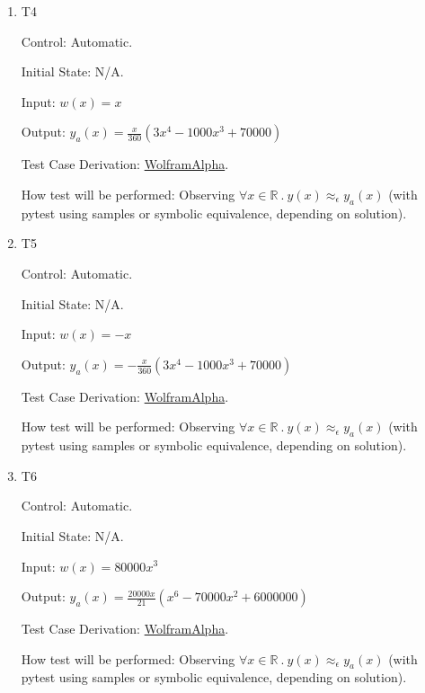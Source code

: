 \documentclass[12pt, titlepage]{article}
\begin{document}
\begin{enumerate}
    \item{T4\\}

    Control: Automatic.

    Initial State: N/A.

    Input: \(w(x) = x\)

    Output: \(y_a(x) = \frac{x}{360} (3x^4 - 1000x^3 + 70000)\)

    Test Case Derivation: \href{https://www.wolframalpha.com/input?i=%5B%2F%2Fmath%3Asolve+y%27%27%27%27%3Dx%2Cy%280%29%3D0%2Cy%2810%29%3D0%2Cy%27%27%280%29%3D0%2Cy%27%27%2810%29%3D0%2F%2F%5D}{WolframAlpha}.

    How test will be performed: Observing \(\forall x \in \mathbb{R}~.~y(x)
    \approx_{\epsilon} y_a(x)\) (with pytest using samples or symbolic
    equivalence, depending on solution).

    \item{T5\\}

    Control: Automatic.

    Initial State: N/A.

    Input: \(w(x) = - x\)

    Output: \(y_a(x) = - \frac{x}{360} (3x^4 - 1000x^3 + 70000)\)

    Test Case Derivation: \href{https://www.wolframalpha.com/input?i=%5B%2F%2Fmath%3Asolve+y%27%27%27%27%3D-x%2Cy%280%29%3D0%2Cy%2810%29%3D0%2Cy%27%27%280%29%3D0%2Cy%27%27%2810%29%3D0%2F%2F%5D}{WolframAlpha}.

    How test will be performed: Observing \(\forall x \in \mathbb{R}~.~y(x)
    \approx_{\epsilon} y_a(x)\) (with pytest using samples or symbolic
    equivalence, depending on solution).

    \item{T6\\}

    Control: Automatic.

    Initial State: N/A.

    Input: \(w(x) = 80000x^3\)

    Output: \(y_a(x) = \frac{20000x}{21} (x^6 - 70000x^2 + 6000000)\)

    Test Case Derivation: \href{https://www.wolframalpha.com/input?i=%5B%2F%2Fmath%3Asolve+y%27%27%27%27%3D80000x%5E3%2Cy%280%29%3D0%2Cy%2810%29%3D0%2Cy%27%27%280%29%3D0%2Cy%27%27%2810%29%3D0%2F%2F%5D}{WolframAlpha}.

    How test will be performed: Observing \(\forall x \in \mathbb{R}~.~y(x)
    \approx_{\epsilon} y_a(x)\) (with pytest using samples or symbolic
    equivalence, depending on solution).


\end{enumerate}
\end{document}
